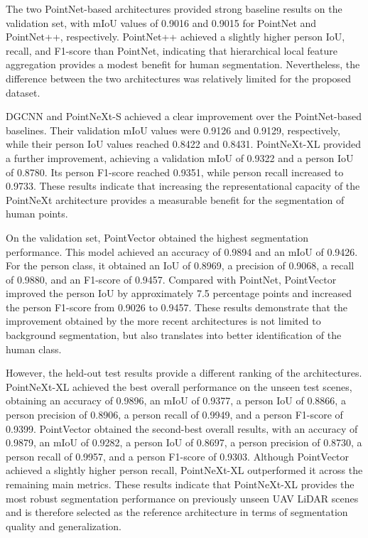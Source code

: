 The two PointNet-based architectures provided strong baseline results on the validation set, with mIoU values of 0.9016 and 0.9015 for PointNet and PointNet++, respectively. PointNet++ achieved a slightly higher person IoU, recall, and F1-score than PointNet, indicating that hierarchical local feature aggregation provides a modest benefit for human segmentation. Nevertheless, the difference between the two architectures was relatively limited for the proposed dataset.

DGCNN and PointNeXt-S achieved a clear improvement over the PointNet-based baselines. Their validation mIoU values were 0.9126 and 0.9129, respectively, while their person IoU values reached 0.8422 and 0.8431. PointNeXt-XL provided a further improvement, achieving a validation mIoU of 0.9322 and a person IoU of 0.8780. Its person F1-score reached 0.9351, while person recall increased to 0.9733. These results indicate that increasing the representational capacity of the PointNeXt architecture provides a measurable benefit for the segmentation of human points.

On the validation set, PointVector obtained the highest segmentation performance. This model achieved an accuracy of 0.9894 and an mIoU of 0.9426. For the person class, it obtained an IoU of 0.8969, a precision of 0.9068, a recall of 0.9880, and an F1-score of 0.9457. Compared with PointNet, PointVector improved the person IoU by approximately 7.5 percentage points and increased the person F1-score from 0.9026 to 0.9457. These results demonstrate that the improvement obtained by the more recent architectures is not limited to background segmentation, but also translates into better identification of the human class.

However, the held-out test results provide a different ranking of the architectures. PointNeXt-XL achieved the best overall performance on the unseen test scenes, obtaining an accuracy of 0.9896, an mIoU of 0.9377, a person IoU of 0.8866, a person precision of 0.8906, a person recall of 0.9949, and a person F1-score of 0.9399. PointVector obtained the second-best overall results, with an accuracy of 0.9879, an mIoU of 0.9282, a person IoU of 0.8697, a person precision of 0.8730, a person recall of 0.9957, and a person F1-score of 0.9303. Although PointVector achieved a slightly higher person recall, PointNeXt-XL outperformed it across the remaining main metrics. These results indicate that PointNeXt-XL provides the most robust segmentation performance on previously unseen UAV LiDAR scenes and is therefore selected as the reference architecture in terms of segmentation quality and generalization.

